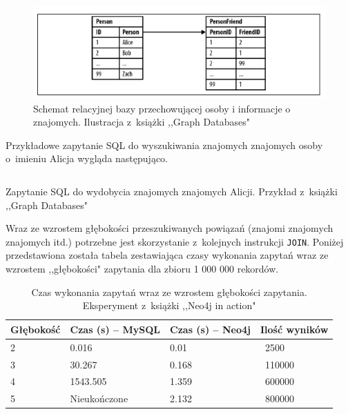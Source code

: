 \documentclass{xmgr}
\begin{document}
\begin{figure}[H]
        \centering
	\includegraphics[scale=0.75]{images/relational-schema-friends.png}
	\caption{Schemat relacyjnej bazy przechowującej osoby i informacje o znajomych. Ilustracja z~książki ,,Graph Databases"\cite{Robinson:2013:GD}}
\end{figure}

Przykładowe zapytanie SQL do wyszukiwania znajomych znajomych osoby o~imieniu Alicja wygląda następująco.

\begin{listing}[H]
	\inputminted{sql}{listings/sql/relational-schema-friends-fof-query.sql}
	\caption{Zapytanie SQL do wydobycia znajomych znajomych Alicji. Przykład z~książki ,,Graph Databases"\cite{Robinson:2013:GD}}
\end{listing}

\newpage
Wraz ze wzrostem głębokości przeszukiwanych powiązań (znajomi znajomych znajomych itd.) potrzebne jest skorzystanie z~kolejnych instrukcji \texttt{JOIN}. Poniżej przedstawiona została tabela zestawiająca czasy wykonania zapytań wraz ze wzrostem ,,głębokości" zapytania dla zbioru 1 000 000 rekordów.

\begin{table}[H]
    \centering
    \begin{tabular}{|l|l|l|l|}
      \hline 
      \textbf{Głębokość} & \textbf{Czas (s) -- MySQL} & \textbf{Czas (s) -- Neo4j} & \textbf{Ilość wyników} \\
      \hline
      2 & 0.016 & 0.01 & {~}2500 \\
      3 & 30.267 & 0.168 & {~}110000 \\
      4 & 1543.505 & 1.359 & {~}600000 \\
      5 & Nieukończone & 2.132 & {~}800000 \\
      \hline
   \end{tabular} 
    \caption{Czas wykonania zapytań wraz ze wzrostem głębokości zapytania. Eksperyment z~książki ,,Neo4j in action"\cite{neo4jinaction}}
    \label{fig:mysqlvsneo4j_results}
\end{table}
\end{document}
